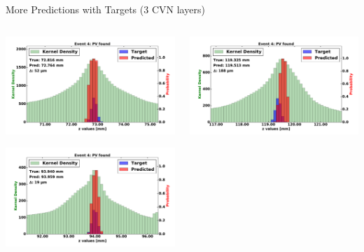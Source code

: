 \begin{frame}{More Predictions with Targets (3 CVN layers)}
  \begin{columns}[c]
        \begin{center}
            \includegraphics[width=1\textwidth,height=0.45\textwidth, trim=18 0 18 0]{images/120000_3layer_24.pdf}
    
            \includegraphics[width=1\textwidth, height=0.45\textwidth,trim=18 0 18 0]{images/120000_3layer_25.pdf}

        \end{center}
        \begin{center}
           \includegraphics[width=1\textwidth, height=0.45\textwidth, trim=18 0 18 0]{images/120000_3layer_26.pdf}
    

\end{center}
\end{columns}
\end{frame}
